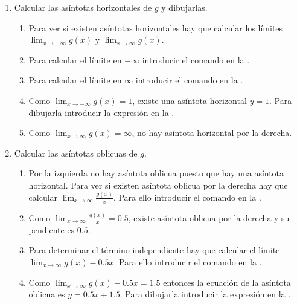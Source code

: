 \begin{enumerate}[leftmargin=*]
\begin{enumerate}
      \item Calcular las asíntotas horizontales de $g$ y dibujarlas.
            \begin{indication}
            \begin{enumerate}
            \item Para ver si existen asíntotas horizontales hay que calcular los límites $\lim_{x\rightarrow -\infty} g(x)$ y $\lim_{x\rightarrow \infty} g(x)$.
            \item Para calcular el límite en $-\infty$ introducir el comando  en la .
            \item Para calcular el límite en $\infty$ introducir el comando  en la .
            \item Como $\lim_{x\rightarrow -\infty} g(x)=1$, existe una asíntota horizontal $y=1$.
                  Para dibujarla introducir la expresión  en la .
            \item Como $\lim_{x\rightarrow \infty} g(x)=\infty$, no hay asíntota horizontal por la derecha.
            \end{enumerate}
            \end{indication}

      \item Calcular las asíntotas oblicuas de $g$.
            \begin{indication}
            \begin{enumerate}
            \item Por la izquierda no hay asíntota oblicua puesto que hay una asíntota horizontal.
                  Para ver si existen asíntota oblicua por la derecha hay que calcular $\lim_{x\rightarrow \infty}\frac{g(x)}{x}$.
                  Para ello introducir el comando  en la .
            \item Como $\lim_{x\rightarrow \infty}\frac{g(x)}{x}=0.5$, existe asíntota oblicua por la derecha y su pendiente es $0.5$.
            \item Para determinar el término independiente hay que calcular el límite $\lim_{x\rightarrow \infty}g(x)-0.5x$.
                  Para ello introducir el comando  en la .
            \item Como $\lim_{x\rightarrow \infty}g(x)-0.5x=1.5$ entonces la ecuación de la asíntota oblicua es $y=0.5x+1.5$.
                  Para dibujarla introducir la expresión  en la .
            \end{enumerate}
            \end{indication}
      \end{enumerate}


\end{enumerate}
